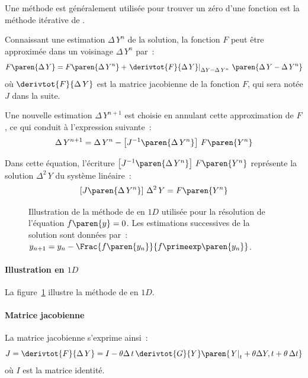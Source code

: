 \documentclass[rectoverso,pleiades,pstricks,leqno,anti]{texmf/note_technique_2010}
\newcommand{\debutpas}[1]{\ensuremath{\left.#1\right|_{t}}}
\begin{document}
Une méthode est généralement utilisée pour trouver un zéro d'une
fonction est la méthode itérative de .

Connaissant une estimation \(\Delta\,Y^{n}\) de la solution, la fonction
\(F\) peut être approximée dans un voisinage \(\Delta\,Y^{n}\) par~:
\[
F\paren{\Delta\,Y}=F\paren{\Delta\,Y^{n}}+\left.\derivtot{F}{\Delta\,Y}\right|_{\Delta
 Y=\Delta\,Y^{n}}\,\paren{\Delta\,Y-\Delta\,Y^{n}}
\]
où \(\derivtot{F}{\Delta\,Y}\) est la matrice jacobienne de la fonction
\(F\), qui sera notée \(J\) dans la suite.

Une nouvelle estimation \(\Delta\,Y^{n+1}\) est choisie en annulant
cette approximation de \(F\), ce qui conduit à l'expression suivante~:
\begin{equation}
  \label{eq:NR}
  \Delta\, Y^{n+1}=\Delta\,Y^{n}-\left[J^{-1}\paren{\Delta\,Y^{n}}\right]\,F\paren{Y^{n}}
\end{equation}

Dans cette équation, l'écriture \(\left[J^{-1}\paren{\Delta\,Y^{n}}\right]\,F\paren{Y^{n}}\) représente la
solution \(\Delta^{2}\,Y\) du système linéaire~:
\[
\left[J\paren{\Delta\,Y^{n}}\right]\,\Delta^{2}\,Y = F\paren{Y^{n}}
\]

\begin{figure}[htbp]
  \centering 
  
  \caption[Illustration de la méthode de  en $1D$ utilisée
  pour la résolution de l'équation $f\paren{y}=0$.]{Illustration de la
    méthode de  en $1D$ utilisée pour la résolution de
    l'équation $f\paren{y}=0$. Les estimations successives de la
    solution sont données par~:
    $y_{n+1}=y_{n}-\Frac{f\paren{y_{n}}}{f\primeexp\paren{y_{n}}}$.}
  \label{fig:illustration_newton_raphson}
\end{figure}

\paragraph{Illustration en \(1D\)} La
figure~\ref{fig:illustration_newton_raphson} illustre la méthode de
 en $1D$.

\paragraph{Matrice jacobienne}
La matrice jacobienne s'exprime ainsi~:
\begin{equation}
  \label{eq:J_implicite}
  J = \derivtot{F}{\Delta\,Y} = I-\theta\Delta\,t\,\derivtot{G}{Y}\paren{\debutpas{Y}+\theta\Delta{Y},t+\theta\,\Delta t}
\end{equation}
où \(I\) est la matrice identité. 
\end{document}
